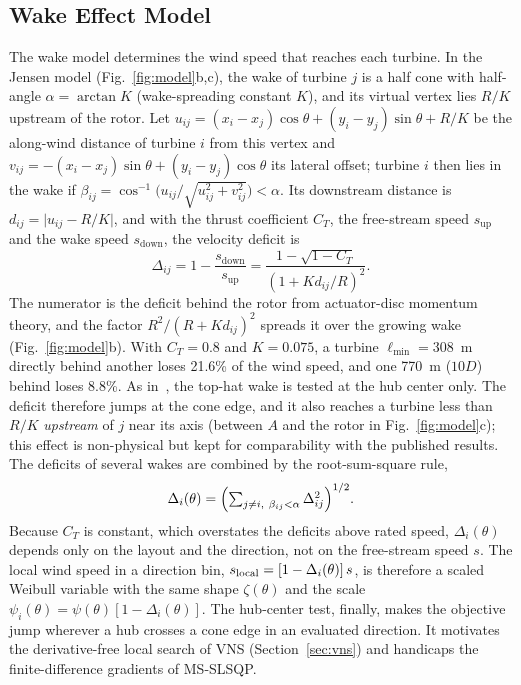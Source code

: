 \subsection{Wake Effect Model}
The wake model determines the wind speed that reaches each turbine. In the Jensen model (Fig.~\ref{fig:model}b,c), the wake of turbine $j$ is a half cone with half-angle $\alpha=\arctan K$ (wake-spreading constant $K$), and its virtual vertex lies $R/K$ upstream of the rotor. Let $u_{ij}=(x_i - x_j)\cos\theta + (y_i - y_j)\sin\theta + R/K$ be the along-wind distance of turbine $i$ from this vertex and $v_{ij}=-(x_i - x_j)\sin\theta + (y_i - y_j)\cos\theta$ its lateral offset; turbine $i$ then lies in the wake if $\beta_{ij}=\cos^{-1}\!\bigl(u_{ij}/\sqrt{u_{ij}^2+v_{ij}^2}\bigr)<\alpha$. Its downstream distance is $d_{ij}=\lvert u_{ij}-R/K\rvert$, and with the thrust coefficient $C_T$, the free-stream speed $s_{\text{up}}$ and the wake speed $s_{\text{down}}$, the velocity deficit is
\begin{equation}
    \Delta_{ij} = 1-\frac{s_{\text{down}}}{s_{\text{up}}}=\frac{1 - \sqrt{1 - C_T}}{\left(1 + K d_{ij}/R\right)^2}.
    \label{eq:deficit}
\end{equation}
The numerator is the deficit behind the rotor from actuator-disc momentum theory, and the factor $R^2/(R+Kd_{ij})^2$ spreads it over the growing wake (Fig.~\ref{fig:model}b). With $C_T=0.8$ and $K=0.075$, a turbine $\ell_{\min}=308$~m directly behind another loses 21.6\% of the wind speed, and one 770~m ($10D$) behind loses 8.8\%.
As in~\cite{Kusiak2010}, the top-hat wake is tested at the hub center only. The deficit therefore jumps at the cone edge, and it also reaches a turbine less than $R/K$ \emph{upstream} of $j$ near its axis (between $A$ and the rotor in Fig.~\ref{fig:model}c); this effect is non-physical but kept for comparability with the published results. The deficits of several wakes are combined by the root-sum-square rule,
\begin{equation}\label{eq5}
\Delta_i(\theta) = \Bigl( \textstyle\sum_{j \ne i,\ \beta_{ij} < \alpha} \Delta_{ij}^2 \Bigr)^{1/2} .
\end{equation}
Because $C_T$ is constant, which overstates the deficits above rated speed, $\Delta_i(\theta)$ depends only on the layout and the direction, not on the free-stream speed $s$. The local wind speed in a direction bin, $s_{\rm local}=[1-\Delta_i(\theta)]\,s$, is therefore a scaled Weibull variable with the same shape $\zeta(\theta)$ and the scale $\psi_i(\theta)=\psi(\theta)[1-\Delta_i(\theta)]$. The hub-center test, finally, makes the objective jump wherever a hub crosses a cone edge in an evaluated direction. It motivates the derivative-free local search of VNS (Section~\ref{sec:vns}) and handicaps the finite-difference gradients of MS-SLSQP.

